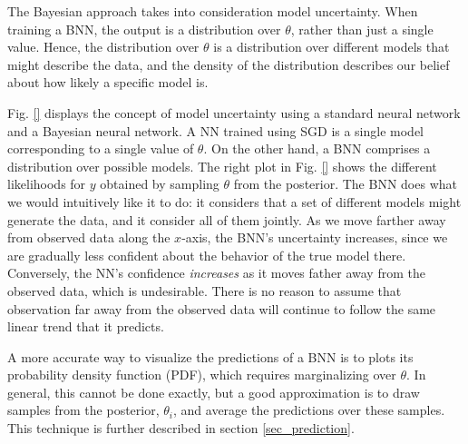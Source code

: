 \documentclass[12pt]{article}
\begin{document}
The Bayesian approach takes into consideration model uncertainty. When training a BNN, the output is a distribution over $\theta$, rather than just a single value. Hence, the distribution over $\theta$ is a distribution over different models that might describe the data, and the density of the distribution describes our belief about how likely a specific model is.

Fig. \ref{} displays the concept of model uncertainty using a standard neural network and a Bayesian neural network. A NN trained using SGD is a single model corresponding to a single value of $\theta$. On the other hand, a BNN comprises a distribution over possible models. The right plot in Fig. \ref{} shows the different likelihoods for $y$ obtained by sampling $\theta$ from the posterior. The BNN does what we would intuitively like it to do: it considers that a set of different models might generate the data, and it consider all of them jointly. As we move farther away from observed data along the $x$-axis, the BNN's uncertainty increases, since we are gradually less confident about the behavior of the true model there. Conversely, the NN's confidence \textit{increases} as it moves father away from the observed data, which is undesirable. There is no reason to assume that observation far away from the observed data will continue to follow the same linear trend that it predicts.

\begin{figure}[h]
\centering
{}
\caption{}
\label{fig_1d_predictions_overlaid}
\end{figure}

A more accurate way to visualize the predictions of a BNN is to plots its probability density function (PDF), which requires marginalizing over $\theta$. In general, this cannot be done exactly, but a good approximation is to draw samples from the posterior, $\theta_i$, and average the predictions over these samples. This technique is further described in section \ref{sec_prediction}.
\end{document}
